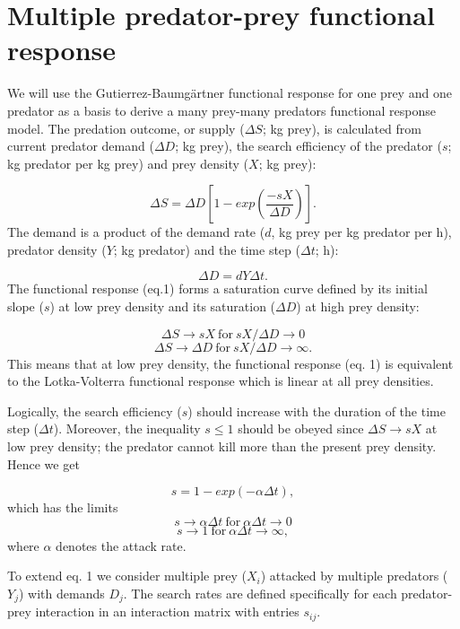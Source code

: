 \documentclass [a4paper, 11pt, openany]  {memoir}
\begin{document}
\section{Multiple predator-prey functional response}
We will use the Gutierrez-Baumg{\"a}rtner functional response for one prey and one predator as a basis to derive a many prey-many predators functional response model. The predation outcome, or supply ($\Delta S$; kg prey), is calculated from current predator demand ($\Delta D$; kg prey), the search efficiency of the predator ($s$; kg predator per kg prey) and prey density ($X$; kg prey):

\begin{equation}
\Delta S = \Delta D \left[1-exp\left(\frac{-sX}{\Delta D}\right)\right].
\end{equation}
The demand is a product of the demand rate ($d$, kg prey per kg predator per h), predator density ($Y$; kg predator) and the time step ($\Delta t$; h):

\[ \Delta D = dY\Delta t .\]
The functional response (eq.1) forms a saturation curve defined by its initial slope ($s$) at low prey density and its saturation ($\Delta D$) at high prey density:

\[  \Delta S \rightarrow sX\ \text{for}\ sX/\Delta D  \rightarrow 0 \]
\[  \Delta S \rightarrow \Delta D\ \text{for}\ sX/\Delta D \rightarrow \infty .\]
This means that at low prey density, the functional response (eq. 1) is equivalent to the Lotka-Volterra functional response which is linear at all prey densities.

Logically, the search efficiency ($s$) should increase with the duration of the time step ($\Delta t$). Moreover, the inequality $s \leq 1$ should be obeyed since $\Delta S \rightarrow sX$ at low prey density; the predator cannot kill more than the present prey density. Hence we get

\begin{equation}
s = 1 - exp(-\alpha \Delta t),
\end{equation}
which has the limits
\[  s \rightarrow \alpha\Delta t\ \text{for}\  \alpha\Delta t \rightarrow 0 \]
\[  s \rightarrow 1\ \text{for}\  \alpha\Delta t \rightarrow \infty ,\]
where $\alpha$ denotes the attack rate.

To extend eq. 1 we consider multiple prey ($X_i$) attacked by multiple predators ($Y_j$) with demands $D_j$. The search rates are defined specifically for each predator-prey interaction in an interaction matrix with entries $s_{ij}$.
\end{document}
